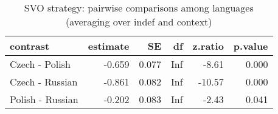 \begin{table}[!h]
\centering
\caption{SVO strategy: pairwise comparisons among languages (averaging over indef and context)}
\centering
\begin{tabular}[t]{lrrrrr}
\toprule
contrast & estimate & SE & df & z.ratio & p.value\\
\midrule
Czech - Polish & -0.659 & 0.077 & Inf & -8.61 & 0.000\\
Czech - Russian & -0.861 & 0.082 & Inf & -10.57 & 0.000\\
Polish - Russian & -0.202 & 0.083 & Inf & -2.43 & 0.041\\
\bottomrule
\end{tabular}
\end{table}
